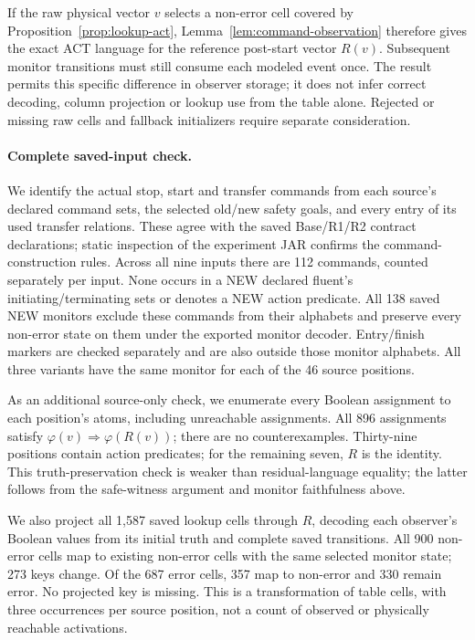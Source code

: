 If the raw physical vector $v$ selects a non-error cell covered by Proposition~\ref{prop:lookup-act}, Lemma~\ref{lem:command-observation} therefore gives the exact ACT language for the reference post-start vector $R(v)$. Subsequent monitor transitions must still consume each modeled event once. The result permits this specific difference in observer storage; it does not infer correct decoding, column projection or lookup use from the table alone. Rejected or missing raw cells and fallback initializers require separate consideration.

\paragraph{Complete saved-input check.}
We identify the actual stop, start and transfer commands from each source's declared command sets, the selected old/new safety goals, and every entry of its used transfer relations. These agree with the saved Base/R1/R2 contract declarations; static inspection of the experiment JAR confirms the command-construction rules. Across all nine inputs there are 112 commands, counted separately per input. None occurs in a NEW declared fluent's initiating/terminating sets or denotes a NEW action predicate. All 138 saved NEW monitors exclude these commands from their alphabets and preserve every non-error state on them under the exported monitor decoder. Entry/finish markers are checked separately and are also outside those monitor alphabets. All three variants have the same monitor for each of the 46 source positions.

As an additional source-only check, we enumerate every Boolean assignment to each position's atoms, including unreachable assignments. All 896 assignments satisfy $\varphi(v)\Rightarrow\varphi(R(v))$; there are no counterexamples. Thirty-nine positions contain action predicates; for the remaining seven, $R$ is the identity. This truth-preservation check is weaker than residual-language equality; the latter follows from the safe-witness argument and monitor faithfulness above.

We also project all 1,587 saved lookup cells through $R$, decoding each observer's Boolean values from its initial truth and complete saved transitions. All 900 non-error cells map to existing non-error cells with the same selected monitor state; 273 keys change. Of the 687 error cells, 357 map to non-error and 330 remain error. No projected key is missing. This is a transformation of table cells, with three occurrences per source position, not a count of observed or physically reachable activations.

